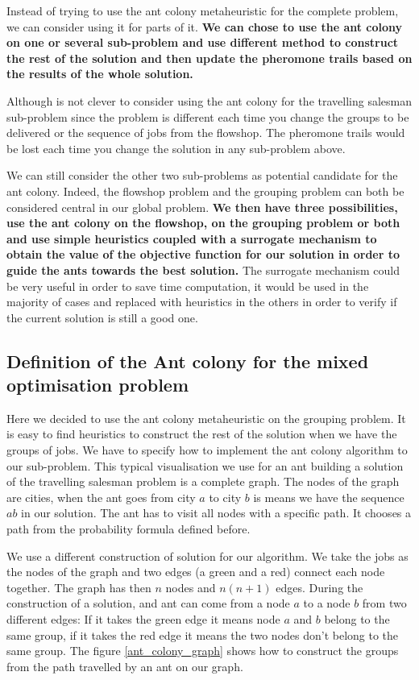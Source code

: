 \documentclass[UTF8, twoside]{EPURapport}
\begin{document}
	Instead of trying to use the ant colony metaheuristic for the complete problem, we can consider using it for parts of it. \textbf{We can chose to use the ant colony on one or several sub-problem and use different method to construct the rest of the solution and then update the pheromone trails based on the results of the whole solution.} 
	
	Although is not clever to consider using the ant colony for the travelling salesman sub-problem since the problem is different each time you change the groups to be delivered or the sequence of jobs from the flowshop. The pheromone trails would be lost each time you change the solution in any sub-problem above.
	
	We can still consider the other two sub-problems as potential candidate for the ant colony. Indeed, the flowshop problem and the grouping problem can both be considered central in our global problem. \textbf{We then have three possibilities, use the ant colony on the flowshop, on the grouping problem or both and use simple heuristics coupled with a surrogate mechanism to obtain the value of the objective function for our solution in order to guide the ants towards the best solution.} The surrogate mechanism could be very useful in order to save time computation, it would be used in the majority of cases and replaced with heuristics in the others in order to verify if the current solution is still a good one.
\\	

\subsection{Definition of the Ant colony for the mixed optimisation problem}
	
	\hspace{4ex}Here we decided to use the ant colony metaheuristic on the grouping problem. It is easy to find heuristics to construct the rest of the solution when we have the groups of jobs. We have to specify how to implement the ant colony algorithm to our sub-problem. This typical visualisation we use for an ant building a solution of the travelling salesman problem is a complete graph. The nodes of the graph are cities, when the ant goes from city $a$ to city $b$ is means we have the sequence $ab$ in our solution. The ant has to visit all nodes with a specific path. It chooses a path from the probability formula defined before.
	
	We use a different construction of solution for our algorithm. We take the jobs as the nodes of the graph and two edges (a green and a red) connect each node together. The graph has then $n$ nodes and $n(n+1)$ edges. During the construction of a solution, and ant can come from a node $a$ to a node $b$ from two different edges: If it takes the green edge it means node $a$ and $b$ belong to the same group, if it takes the red edge it means the two nodes don't belong to the same group. The figure \ref{ant_colony_graph} shows how to construct the groups from the path travelled by an ant on our graph.
\\
\end{document}
